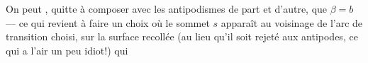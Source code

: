 On peut , quitte à composer avec les antipodismes de part et d'autre, que $\beta=b$ --- ce qui revient à faire un choix où le sommet $s$ apparaît  au voisinage de l'arc de transition choisi, sur la surface recollée (au lieu qu'il soit rejeté aux antipodes, ce qui a l'air un peu idiot!)
 qui

